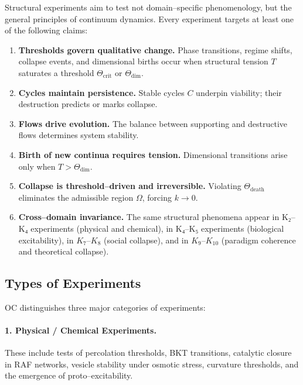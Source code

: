 Structural experiments aim to test not domain–specific phenomenology, but the
general principles of continuum dynamics.  
Every experiment targets at least one of the following claims:

\begin{enumerate}
    \item \textbf{Thresholds govern qualitative change.}  
          Phase transitions, regime shifts, collapse events, and dimensional
          births occur when structural tension $T$ saturates a threshold
          $\Theta_{\mathrm{crit}}$ or $\Theta_{\mathrm{dim}}$.

    \item \textbf{Cycles maintain persistence.}  
          Stable cycles $C$ underpin viability; their destruction predicts or
          marks collapse.

    \item \textbf{Flows drive evolution.}  
          The balance between supporting and destructive flows determines
          system stability.

    \item \textbf{Birth of new continua requires tension.}  
          Dimensional transitions arise only when $T > \Theta_{\mathrm{dim}}$.

    \item \textbf{Collapse is threshold–driven and irreversible.}  
          Violating $\Theta_{\mathrm{death}}$ eliminates the admissible region
          $\Omega$, forcing $k\to 0$.

    \item \textbf{Cross–domain invariance.}  
          The same structural phenomena appear in K₂–K₄ experiments (physical
          and chemical), in K₄–K₅ experiments (biological excitability), in
          $K_7$–$K_8$ (social collapse), and in $K_9$–$K_{10}$ (paradigm coherence and
          theoretical collapse).
\end{enumerate}


\subsection{Types of Experiments}

OC distinguishes three major categories of experiments:

\paragraph{1. Physical / Chemical Experiments.}  
These include tests of percolation thresholds, BKT transitions, catalytic
closure in RAF networks, vesicle stability under osmotic stress, curvature
thresholds, and the emergence of proto–excitability.

